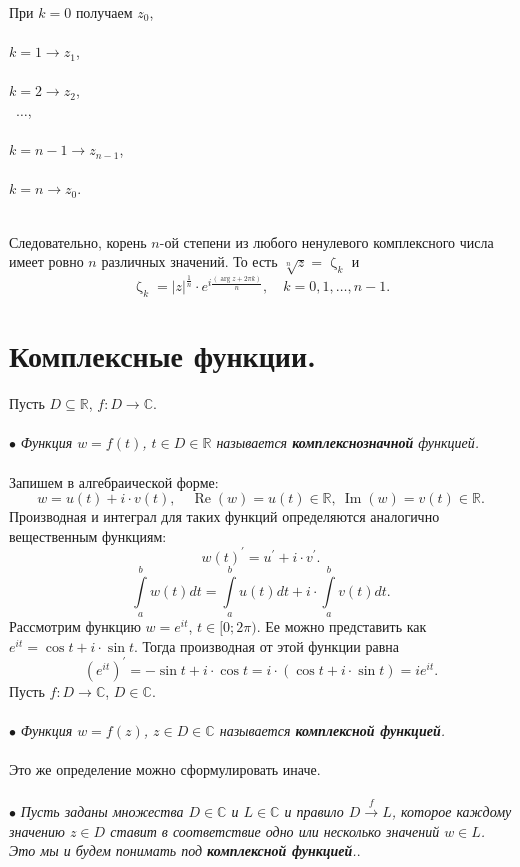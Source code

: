 \documentclass[a4paper, 12pt]{article}
\newcommand{\Rm}{\mathbb{R}}
\newcommand{\Cm}{\mathbb{C}}
\newcommand{\p}{\prime}
\renewcommand{\Re}{\operatorname{Re}}
\renewcommand{\Im}{\operatorname{Im}}
\newcommand\ef[1]{e^{i#1}}
\begin{document}
\hfill
\parbox[b][6.5cm][t]{65mm}{
	При $k = 0$ получаем $z_0$,\\\\ $k=1\to z_1$,\\\\ $k=2\to z_2$,\\\ $\ldots$,\\\\ $k=n-1\to z_{n-1}$,\\\\ $k = n\to z_0$. }\\
Следовательно, корень $n$-ой степени из любого ненулевого комплексного числа имеет ровно $n$ различных значений. То есть $\sqrt[n]{z} = \upzeta_k$ и $$\upzeta_k = |z|^{\frac1n}\cdot \ef{\frac{(\arg z + 2\pi k)}{n}},\quad k = 0,1,\ldots,n-1.$$
\section{Комплексные функции.}
Пусть $D\subseteq \Rm$, $f:D\to\Cm$.\\\\
$\bullet$ \textit{Функция $w=f(t)$, $t\in D\in\Rm$ называется \textbf{комплекснозначной} функцией.}\\\\
Запишем в алгебраической форме:
$$w=u(t)+i\cdot v(t),\quad \Re (w) = u(t)\in\Rm,\ \Im (w) = v(t)\in\Rm.$$
Производная и интеграл для таких функций определяются аналогично вещественным функциям:
$$w(t)^\p = u^\p + i\cdot v^\p.$$
$$\int\limits_{a}^bw(t)dt = \int\limits_{a}^bu(t)dt + i\cdot \int\limits_{a}^bv(t)dt.$$
Рассмотрим функцию $w = e^{it}$, $t\in[0;2\pi)$. Ее можно представить как $e^{it} = \cos t + i\cdot \sin t.$ Тогда производная от этой функции равна $$(e^{it})^\p = -\sin t + i\cdot \cos t = i\cdot (\cos t + i\cdot \sin t) = ie^{it}.$$
Пусть $f : D\to \Cm$, $D\in \Cm$.\\\\
$\bullet$\textit{ Функция $w = f(z)$, $z\in D\in\Cm$ называется \textbf{комплексной функцией}.}\\\\
Это же определение можно сформулировать иначе.\\\\
$\bullet$ \textit{Пусть заданы множества $D\in \Cm$ и $L\in\Cm$ и правило $D\overset{f}{\to}L$, которое каждому значению $z\in D$ ставит в соответствие одно или несколько значений $w \in L$. Это мы и будем понимать под \textbf{комплексной функцией}.}.\\\\
\end{document}
